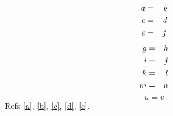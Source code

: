 \documentclass{article}
\begin{document}
\begin{eqnarray}
a &=& b \nonumber \cr
c &=& d \label{a} \\
e &=& f \label{b}
\end{eqnarray}
\begin{eqnarray}
g &=& h \label{c} \nonumber \cr
i &=& j \cr
k &=& l \label{d} \nonumber \\
m &=& n
\end{eqnarray}
\begin{equation} u = v \label{e} \end{equation}
Refs \ref{a}, \ref{b}, \ref{c}, \ref{d}, \ref{e}.
\end{document}
